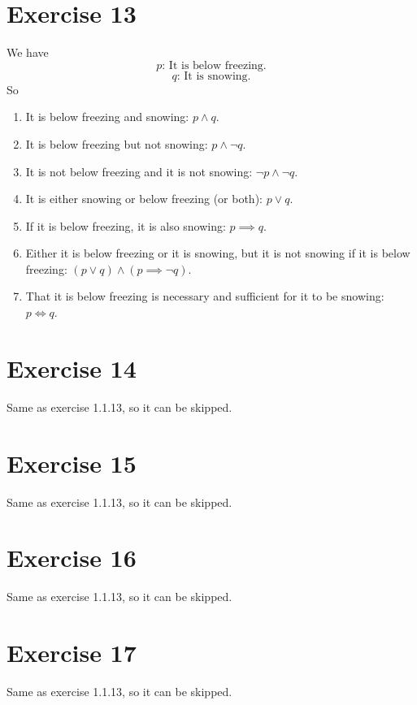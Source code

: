 \documentclass{article}
\begin{document}
    \section*{Exercise 13}
    We have 
    \[ p \text{: It is below freezing.} \]
    \[ q \text{: It is snowing.} \]
    So
    \begin{enumerate}[label=\textbf{\alph*.}]
        \item
            It is below freezing and snowing:
            $p \land q$.
        \item
            It is below freezing but not snowing:
            $p \land \neg q$.
        \item 
            It is not below freezing and it is not snowing:
            $\neg p \land \neg q$.
        \item 
            It is either snowing or below freezing (or both):
            $p \lor q$.
        \item
            If it is below freezing, it is also snowing:
            $p \implies q$.
        \item
            Either it is below freezing or it is snowing, but it is
            not snowing if it is below freezing:
            $(p \lor q) \land (p \implies \neg q)$.
        \item
            That it is below freezing is necessary and sufficient
            for it to be snowing:
            $p \iff q$.
    \end{enumerate}


    \section*{Exercise 14}
    Same as exercise 1.1.13, so it can be skipped.


    \section*{Exercise 15}
    Same as exercise 1.1.13, so it can be skipped.

    \section*{Exercise 16}
    Same as exercise 1.1.13, so it can be skipped.

    
    \section*{Exercise 17}
    Same as exercise 1.1.13, so it can be skipped.
\end{document}
